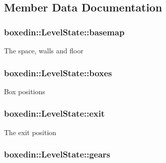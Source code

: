 \subsection{Member Data Documentation}
\hypertarget{classboxedin_1_1LevelState_ad16af891d79850a4a8724d90d82b1243}{
\subsubsection[{basemap}]{ boxedin\+::\+Level\+State\+::basemap\hspace{0.3cm}{\ttfamily [static]}}}\label{classboxedin_1_1LevelState_ad16af891d79850a4a8724d90d82b1243}
The space, walls and floor \hypertarget{classboxedin_1_1LevelState_a49db037f37aefc1ee2e41ff36735cfdf}{
\subsubsection[{boxes}]{ boxedin\+::\+Level\+State\+::boxes}}\label{classboxedin_1_1LevelState_a49db037f37aefc1ee2e41ff36735cfdf}
Box positions \hypertarget{classboxedin_1_1LevelState_a40f55b388488172493c0fd685bdb2479}{
\subsubsection[{exit}]{ boxedin\+::\+Level\+State\+::exit\hspace{0.3cm}{\ttfamily [static]}}}\label{classboxedin_1_1LevelState_a40f55b388488172493c0fd685bdb2479}
The exit position \hypertarget{classboxedin_1_1LevelState_a5df7e9d9733bf4dab9132203e8e87b0d}{
\subsubsection[{gears}]{ boxedin\+::\+Level\+State\+::gears\hspace{0.3cm}{\ttfamily [static]}}}\label{classboxedin_1_1LevelState_a5df7e9d9733bf4dab9132203e8e87b0d}
